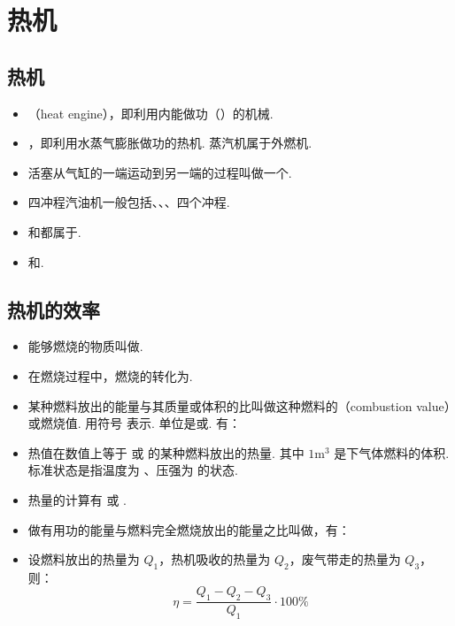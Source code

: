 \newpage
\section{热机}

\subsection{热机}
\vspace{10pt}
\begin{itemize}
\item {}（heat engine），即利用内能做功（）的机械.
\item {}，即利用水蒸气膨胀做功的热机. 蒸汽机属于外燃机.
\item 活塞从气缸的一端运动到另一端的过程叫做一个.
\item 四冲程汽油机一般包括、、、四个冲程.
\item {}和都属于.
\item {}和.
\end{itemize}

\subsection{热机的效率}
\vspace{10pt}
\begin{itemize}
\item 能够燃烧的物质叫做.
\item 在燃烧过程中，燃烧的转化为.
\item 某种燃料放出的能量与其质量或体积的比叫做这种燃料的（combustion value）或燃烧值. 用符号  表示. 单位是或. 有：
\item 热值在数值上等于  或  的某种燃料放出的热量. 其中 $1\text{m}^3$ 是下气体燃料的体积. 标准状态是指温度为 、压强为  的状态.
\item 热量的计算有  或 .
\item 做有用功的能量与燃料完全燃烧放出的能量之比叫做，有：
\item 设燃料放出的热量为 $Q_1$，热机吸收的热量为 $Q_2$，废气带走的热量为 $Q_3$，则：
$$
\eta=\frac{Q_1-Q_2-Q_3}{Q_1}\cdot100\%
$$
\end{itemize}